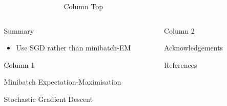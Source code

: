 \documentclass[final]{beamer}
\newlength{\sepwidth}
\newlength{\colwidth}
\newlength{\doublewidth}
\newcommand{\separatorcolumn}{\begin{column}{\sepwidth}\end{column}}
\begin{document}
\begin{frame}[t]

\begin{columns}[t]

\separatorcolumn
\begin{column}{\doublewidth}
\begin{block}{Column Top}
\end{block}
\end{column}

\separatorcolumn

\end{columns}

\begin{columns}[t]
\separatorcolumn

\begin{column}{\colwidth}
    
    \begin{alertblock}{Summary}
        \begin{itemize}
            \item Use SGD rather than minibatch-EM
        \end{itemize}
    \end{alertblock}
    
    \begin{block}{Column 1}
    \end{block}

    \begin{block}{Minibatch Expectation-Maximisation}
    \end{block}

    \begin{block}{Stochastic Gradient Descent}
    \end{block}
    
\end{column}

\separatorcolumn

\begin{column}{\colwidth}

    \begin{block}{Column 2}
    \end{block}

    \begin{block}{Acknowledgements}
    \end{block}

    \begin{block}{References}

    \nocite{*}
    \footnotesize{}

    \end{block}
    
\end{column}

\separatorcolumn
\end{columns}
\end{frame}
\end{document}
